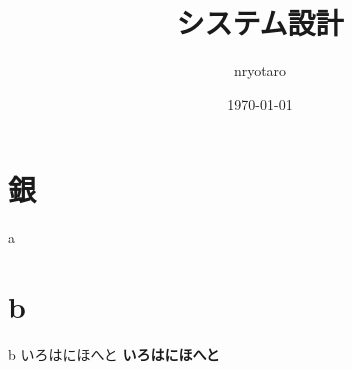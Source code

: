 \documentclass{jlreq}
\begin{document}
\title{システム設計}
\author{nryotaro}
\date{\today}
\maketitle
\tableofcontents
\section{銀}
a
\section{b}
b
いろはにほへと
\textbf{いろはにほへと}
\end{document}
